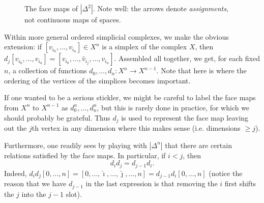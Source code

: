 \documentclass[12pt]{article}
\theoremstyle{plain}
\theoremstyle{definition}
\theoremstyle{remark}
\begin{document}
\begin{figure}[!htp]
\begin{center}
\end{center}
\caption{The face maps of $|\Delta^2|$. Note well: the arrows denote \emph{assignments}, not continuous maps of spaces. }\label{F: fig3}
\end{figure}


Within more general ordered simplicial complexes, we make the obvious extension: if $[v_{i_0},\ldots, v_{i_n}]\in X^n$ is a simplex of the complex $X$, then $d_j[v_{i_0},\ldots, v_{i_n}]=[v_{i_0},\ldots,\hat v_{i_j},\dots, v_{i_n}]$. Assembled all together, we get, for each fixed $n$, a collection of functions $d_0,\ldots, d_n\colon X^n\to X^{n-1}$. Note that here is where the ordering of the vertices of the simplices becomes important.

If one wanted to be a serious stickler, we might be careful to label the face maps from $X^n$ to $X^{n-1}$ as $d_0^n, \ldots, d_n^n$, but this is rarely done in practice, for which we should probably be grateful. Thus $d_j$ is used to represent the face map leaving out the $j$th vertex in any dimension where this makes sense (i.e. dimensions $\geq j$).

Furthermore, one readily sees by playing with $|\Delta^n|$ that there are certain relations satisfied by the face maps. In particular, if $i<j$, then 
\begin{equation}\label{E: d com}
d_id_j=d_{j-1}d_i.
\end{equation}
 Indeed, $d_id_j[0,\ldots, n]=[0,\ldots, \hat \imath,\ldots, \hat \jmath,\ldots, n]=d_{j-1}d_i[0,\ldots,n]$ (notice the reason that we have $d_{j-1}$ in the last expression is that removing the $i$ first shifts the $j$ into the $j-1$ slot). 
\end{document}

